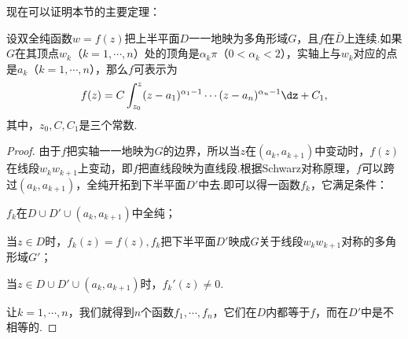 现在可以证明本节的主要定理：
\begin{theorem}\label{thm7.4.3}
设双全纯函数$w=f(z)$把上半平面$D$一一地映为多角形域$G$，且$f$在$\bar D$上连续.如果$G$在其顶点$w_k$（$k=1,\cdots,n$）处的顶角是$\alpha_k\pi$（$0<\alpha_k<2$），实轴上与$w_k$对应的点是$a_k$（$k=1,\cdots,n$），那么$f$可表示为
\begin{equation}\label{eq7.4.5}
f(z)=C\int_{z_0}^z(z-a_1)^{\alpha_1-1}\cdots(z-a_n)^{\alpha_n-1}\dz+C_1,
\end{equation}
其中，$z_0,C,C_1$是三个常数.
\end{theorem}
\begin{proof}
由于$f$把实轴一一地映为$G$的边界，所以当$z$在$(a_k,a_{k+1})$中变动时，$f(z)$在线段$w_kw_{k+1}$上变动，即$f$把直线段映为直线段.根据Schwarz对称原理，$f$可以跨过$(a_k,a_{k+1})$，全纯开拓到下半平面$D'$中去.即可以得一函数$f_k$，它满足条件：
\begin{eenum}
  \item $f_k$在$D\cup D'\cup(a_k,a_{k+1})$中全纯；
  \item 当$z\in D$时，$f_k(z)=f(z),f_k$把下半平面$D'$映成$G$关于线段$w_kw_{k+1}$对称的多角形域$G'$；
  \item 当$z\in D\cup D'\cup(a_k,a_{k+1})$时，$f_k'(z)\ne0$.
\end{eenum}
让$k=1,\cdots,n$，我们就得到$n$个函数$f_1,\cdots,f_n$，它们在$D$内都等于$f$，而在$D'$中是不相等的.


\end{proof}
